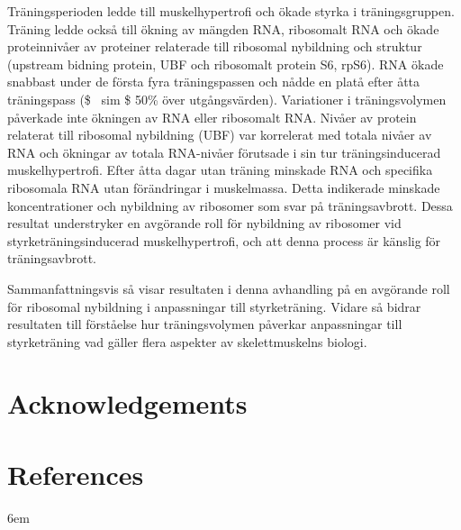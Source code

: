 \documentclass[twoside,10pt]{gihclass} %
\begin{document}
Träningsperioden ledde till muskelhypertrofi och ökade styrka i träningsgruppen. Träning ledde också till ökning av mängden RNA, ribosomalt RNA och ökade proteinnivåer av proteiner relaterade till ribosomal nybildning och struktur (upstream bidning protein, UBF och ribosomalt protein S6, rpS6).
RNA ökade snabbast under de första fyra träningspassen och nådde en platå efter åtta träningspass (\$ ~sim \$ 50\% över utgångsvärden). Variationer i träningsvolymen påverkade inte ökningen av RNA eller ribosomalt RNA.
Nivåer av protein relaterat till ribosomal nybildning (UBF) var korrelerat med totala nivåer av RNA och ökningar av totala RNA-nivåer förutsade i sin tur träningsinducerad muskelhypertrofi. Efter åtta dagar utan träning minskade RNA och specifika ribosomala RNA utan förändringar i muskelmassa. Detta indikerade minskade koncentrationer och nybildning av ribosomer som svar på träningsavbrott. Dessa resultat understryker en avgörande roll för nybildning av ribosomer vid styrketräningsinducerad muskelhypertrofi, och att denna process är känslig för träningsavbrott.

Sammanfattningsvis så visar resultaten i denna avhandling på en avgörande roll för ribosomal nybildning i anpassningar till styrketräning. Vidare så bidrar resultaten till förståelse hur träningsvolymen påverkar anpassningar till styrketräning vad gäller flera aspekter av skelettmuskelns biologi.

\hypertarget{acknowledgements}{%
\chapter{Acknowledgements}\label{acknowledgements}}

\backmatter

\hypertarget{references}{%
\chapter*{References}\label{references}}


\setlength{\parskip}{4pt}

\rightskip6em

\footnotesize
\end{document}
